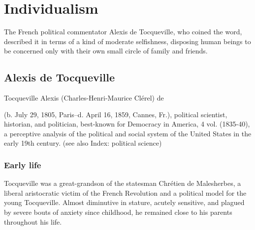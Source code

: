 \documentclass[12pt]{article}
\begin{document}
\footnotesize{\tableofcontents}


\section{Individualism}
The French political commentator Alexis de Tocqueville, who coined the
word, described it in terms of a kind of moderate selfishness,
disposing human beings to be concerned only with their own small
circle of family and friends. 

\subsection{Alexis de Tocqueville}
Tocqueville Alexis (Charles-Henri-Maurice Cl\'{e}rel) de

(b. July 29, 1805, Paris--d. April 16, 1859, Cannes, Fr.), political
scientist, historian, and politician, best-known for Democracy in
America, 4 vol. (1835-40), a perceptive analysis of the political
and social system of the United States in the early 19th century. (see
also Index: political science) 


\subsubsection{Early life}
Tocqueville was a great-grandson of the statesman Chr\'{e}tien de
                                      Malesherbes, a liberal aristocratic victim of the French Revolution
                                      and a political model for the young Tocqueville. Almost diminutive in
                                      stature, acutely sensitive, and plagued by severe bouts of anxiety
                                      since childhood, he remained close to his parents throughout his life. 
\end{document}
